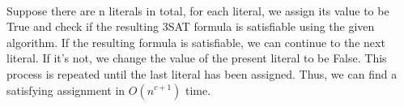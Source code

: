 \begin{problem}{3} ~\\
Suppose there are n literals in total, for each literal, we assign its value to be True and check if the resulting 3SAT formula is satisfiable using the given algorithm. If the resulting formula is satisfiable, we can continue to the next literal. If it's not, we change the value of the present literal to be False. This process is repeated until the last literal has been assigned. Thus, we can find a satisfying assignment in $O(n^{c+1})$ time.
\end{problem}